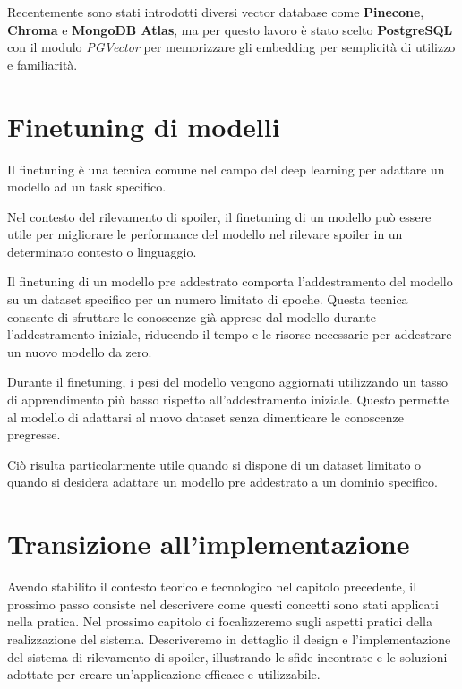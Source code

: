 Recentemente sono stati introdotti diversi vector database
come \textbf{Pinecone}, \textbf{Chroma} e \textbf{MongoDB
  Atlas}, ma per questo lavoro è stato scelto
\textbf{PostgreSQL} con il modulo \textit{PGVector} per
memorizzare gli embedding per semplicità di utilizzo e
familiarità.

\section{Finetuning di modelli}
\label{sec:finetuning-di-modelli}

Il finetuning è una tecnica comune nel campo del deep
learning per adattare un modello ad un task specifico.

Nel contesto del rilevamento di spoiler, il finetuning di
un modello può essere utile per migliorare le performance
del modello nel rilevare spoiler in un determinato contesto
o linguaggio.

Il finetuning di un modello pre addestrato comporta
l'addestramento del modello su un dataset specifico per un
numero limitato di epoche.
Questa tecnica consente di sfruttare le conoscenze già
apprese dal modello durante l'addestramento iniziale,
riducendo il tempo e le risorse necessarie per addestrare
un nuovo modello da zero.

Durante il finetuning, i pesi del modello vengono
aggiornati utilizzando un tasso di apprendimento più basso
rispetto all'addestramento iniziale.
Questo permette al modello di adattarsi al nuovo dataset
senza dimenticare le conoscenze pregresse.

Ciò risulta particolarmente utile quando si dispone di un
dataset limitato o quando si desidera adattare un modello
pre addestrato a un dominio specifico.

\newpage
\section{Transizione all'implementazione}
\label{sec:transizione-implementazione}
Avendo stabilito il contesto teorico e tecnologico nel
capitolo precedente, il prossimo passo consiste nel
descrivere come questi concetti sono stati applicati nella
pratica.
Nel prossimo capitolo ci focalizzeremo sugli aspetti
pratici della realizzazione del sistema.
Descriveremo in dettaglio il design e l'implementazione del
sistema di rilevamento di spoiler, illustrando le sfide
incontrate e le soluzioni adottate per creare
un'applicazione efficace e utilizzabile.

